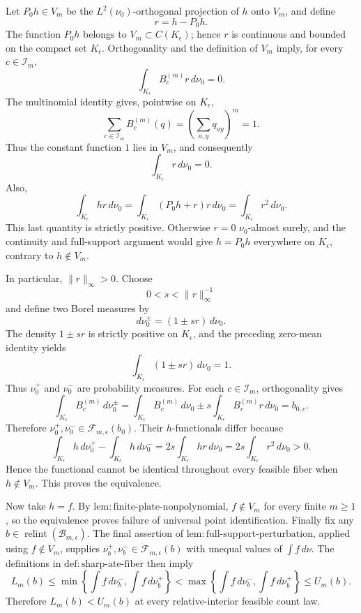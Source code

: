Let \(P_0h\in V_m\) be the \(L^2(\nu_0)\)-orthogonal projection of \(h\) onto \(V_m\), and define
\[
r=h-P_0h.
\]
The function \(P_0h\) belongs to \(V_m\subset C(K_{\epsilon})\); hence \(r\) is continuous and bounded on the compact set \(K_{\epsilon}\). Orthogonality and the definition of \(V_m\) imply, for every \(c\in\mathcal I_m\),
\[
\int_{K_{\epsilon}}B_c^{(m)}r\,d\nu_0=0.
\]
The multinomial identity gives, pointwise on \(K_{\epsilon}\),
\[
\sum_{c\in\mathcal I_m}B_c^{(m)}(q)
=\left(\sum_{a,y}q_{ay}\right)^m
=1.
\]
Thus the constant function \(1\) lies in \(V_m\), and consequently
\[
\int_{K_{\epsilon}}r\,d\nu_0=0.
\]
Also,
\[
\int_{K_{\epsilon}}hr\,d\nu_0
=\int_{K_{\epsilon}}(P_0h+r)r\,d\nu_0
=\int_{K_{\epsilon}}r^2\,d\nu_0.
\]
This last quantity is strictly positive. Otherwise \(r=0\) \(\nu_0\)-almost surely, and the continuity and full-support argument would give \(h=P_0h\) everywhere on \(K_{\epsilon}\), contrary to \(h\notin V_m\).

In particular, \(\lVert r\rVert_{\infty}>0\). Choose
\[
0<s<\lVert r\rVert_{\infty}^{-1}
\]
and define two Borel measures by
\[
d\nu_0^{\pm}=(1\pm sr)\,d\nu_0.
\]
The density \(1\pm sr\) is strictly positive on \(K_{\epsilon}\), and the preceding zero-mean identity yields
\[
\int_{K_{\epsilon}}(1\pm sr)\,d\nu_0=1.
\]
Thus \(\nu_0^+\) and \(\nu_0^-\) are probability measures. For each \(c\in\mathcal I_m\), orthogonality gives
\[
\int_{K_{\epsilon}}B_c^{(m)}\,d\nu_0^{\pm}
=\int_{K_{\epsilon}}B_c^{(m)}\,d\nu_0
 \pm s\int_{K_{\epsilon}}B_c^{(m)}r\,d\nu_0
=b_{0,c}.
\]
Therefore \(\nu_0^+,\nu_0^-\in\mathcal F_{m,\epsilon}(b_0)\). Their \(h\)-functionals differ because
\[
\int_{K_{\epsilon}}h\,d\nu_0^+
-\int_{K_{\epsilon}}h\,d\nu_0^-
=2s\int_{K_{\epsilon}}hr\,d\nu_0
=2s\int_{K_{\epsilon}}r^2\,d\nu_0
>0.
\]
Hence the functional cannot be identical throughout every feasible fiber when \(h\notin V_m\). This proves the equivalence.

Now take \(h=f\). By \(\mathrm{lem{:}finite\text{-}plate\text{-}nonpolynomial}\), \(f\notin V_m\) for every finite \(m\ge1\), so the equivalence proves failure of universal point identification. Finally fix any \(b\in\operatorname{relint}(\mathcal B_{m,\epsilon})\). The final assertion of \(\mathrm{lem{:}full\text{-}support\text{-}perturbation}\), applied using \(f\notin V_m\), supplies \(\nu_b^+,\nu_b^-\in\mathcal F_{m,\epsilon}(b)\) with unequal values of \(\int f\,d\nu\). The definitions in \(\mathrm{def{:}sharp\text{-}ate\text{-}fiber}\) then imply
\[
L_m(b)
\le
\min\left\{\int f\,d\nu_b^-,\int f\,d\nu_b^+\right\}
<
\max\left\{\int f\,d\nu_b^-,\int f\,d\nu_b^+\right\}
\le
U_m(b).
\]
Therefore \(L_m(b)<U_m(b)\) at every relative-interior feasible count law.